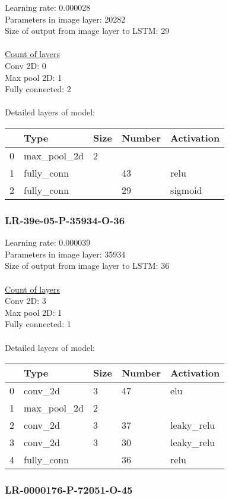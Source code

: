Learning rate: 0.000028
\\Parameters in image layer: 20282
\\Size of output from image layer to LSTM: 29
\\\\\underline{Count of layers} 
\\Conv 2D:           0\\Max pool 2D:      1\\Fully connected:  2
\\\\Detailed layers of model: \\\begin{tabular}{rllll}
\hline
    & Type        & Size   & Number   & Activation   \\
\hline
  0 & max\_pool\_2d & 2      &          &              \\
  1 & fully\_conn  &        & 43       & relu         \\
  2 & fully\_conn  &        & 29       & sigmoid      \\
\hline
\end{tabular}\subsubsection*{LR-39e-05-P-35934-O-36}
Learning rate: 0.000039
\\Parameters in image layer: 35934
\\Size of output from image layer to LSTM: 36
\\\\\underline{Count of layers} 
\\Conv 2D:           3\\Max pool 2D:      1\\Fully connected:  1
\\\\Detailed layers of model: \\\begin{tabular}{rllll}
\hline
    & Type        & Size   & Number   & Activation   \\
\hline
  0 & conv\_2d     & 3      & 47       & elu          \\
  1 & max\_pool\_2d & 2      &          &              \\
  2 & conv\_2d     & 3      & 37       & leaky\_relu   \\
  3 & conv\_2d     & 3      & 30       & leaky\_relu   \\
  4 & fully\_conn  &        & 36       & relu         \\
\hline
\end{tabular}\subsubsection*{LR-0000176-P-72051-O-45}

